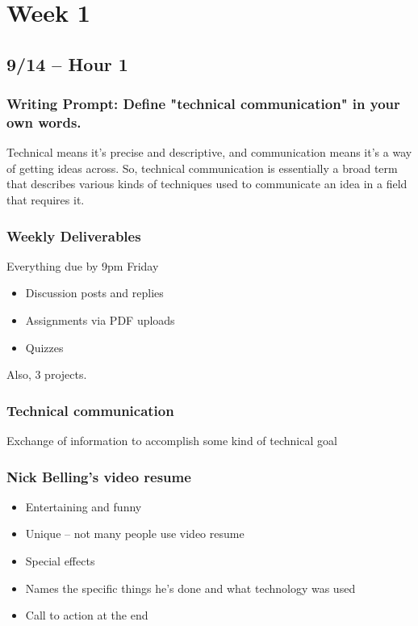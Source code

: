 \chapter{Week 1}

\section{9/14 -- Hour 1}

\subsection{Writing Prompt: Define "technical communication" in your own words.}

Technical means it's precise and descriptive, and communication means it's a way of getting ideas across. So, technical communication is essentially a broad term that describes various kinds of techniques used to communicate an idea in a field that requires it.
  
\subsection{Weekly Deliverables}

Everything due by 9pm Friday

\begin{itemize}
    \item Discussion posts and replies
    \item Assignments via PDF uploads
    \item Quizzes
\end{itemize}

Also, 3 projects.

\subsection{Technical communication}

\begin{outline}
    \1 Exchange of information to accomplish some kind of technical goal
\end{outline}

\subsection{Nick Belling's video resume}

\begin{itemize}
    \item Entertaining and funny
    \item Unique -- not many people use video resume
    \item Special effects
    \item Names the specific things he's done and what technology was used
    \item Call to action at the end
\end{itemize}

